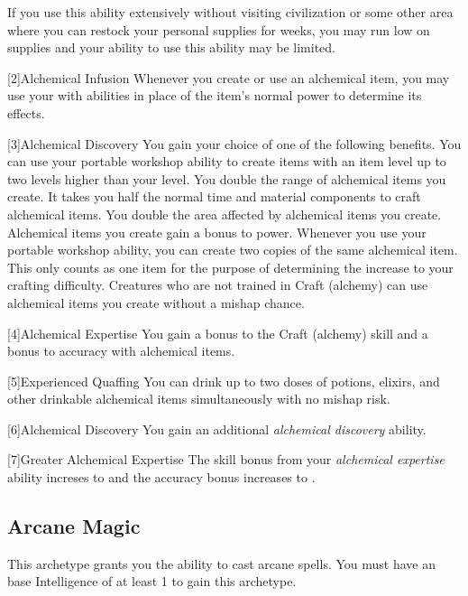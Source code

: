         If you use this ability extensively without visiting civilization or some other area where you can restock your personal supplies for weeks, you may run low on supplies and your ability to use this ability may be limited.

        [2]{Alchemical Infusion} Whenever you create or use an alchemical item, you may use your  with  abilities in place of the item's normal power to determine its effects.

        [3]{Alchemical Discovery} You gain your choice of one of the following benefits.
        {
             You can use your portable workshop ability to create items with an item level up to two levels higher than your level.
             You double the range of alchemical items you create.
             It takes you half the normal time and material components to craft alchemical items.
             You double the area affected by alchemical items you create.
             Alchemical items you create gain a  bonus to power.
             Whenever you use your portable workshop ability, you can create two copies of the same alchemical item.
            This only counts as one item for the purpose of determining the increase to your crafting difficulty.
             Creatures who are not trained in Craft (alchemy) can use alchemical items you create without a mishap chance.
        }

        [4]{Alchemical Expertise} You gain a  bonus to the Craft (alchemy) skill and a  bonus to accuracy with alchemical items.

        [5]{Experienced Quaffing} You can drink up to two doses of potions, elixirs, and other drinkable alchemical items simultaneously with no mishap risk.

        [6]{Alchemical Discovery} You gain an additional \textit{alchemical discovery} ability.

        [7]{Greater Alchemical Expertise} The skill bonus from your \textit{alchemical expertise} ability increses to  and the accuracy bonus increases to .

    \subsection{Arcane Magic}
        This archetype grants you the ability to cast arcane spells.
        You must have an base Intelligence of at least 1 to gain this archetype.

